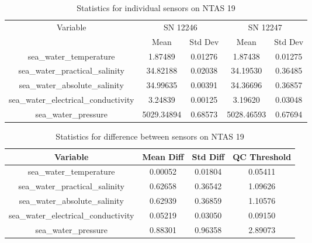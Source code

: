 \begin{table}[h]
\centering
\begin{tabular}{|c|c|c|c|c|}
\hline
Variable & \multicolumn{2}{c|}{SN 12246} & \multicolumn{2}{c|}{SN 12247} \\
& Mean & Std Dev & Mean & Std Dev \\
\hline
sea\_water\_temperature & 1.87489 & 0.01276 & 1.87438 & 0.01275 \\
sea\_water\_practical\_salinity & 34.82188 & 0.02038 & 34.19530 & 0.36485 \\
sea\_water\_absolute\_salinity & 34.99635 & 0.00391 & 34.36696 & 0.36857 \\
sea\_water\_electrical\_conductivity & 3.24839 & 0.00125 & 3.19620 & 0.03048 \\
sea\_water\_pressure & 5029.34894 & 0.68573 & 5028.46593 & 0.67694 \\
\hline
\end{tabular}
\caption{Statistics for individual sensors on NTAS 19}
\end{table}

\begin{table}[h]
\centering
\begin{tabular}{|c|c|c|c|}
\hline
Variable & Mean Diff & Std Diff & QC Threshold \\
\hline
sea\_water\_temperature & 0.00052 & 0.01804 & 0.05411 \\
sea\_water\_practical\_salinity & 0.62658 & 0.36542 & 1.09626 \\
sea\_water\_absolute\_salinity & 0.62939 & 0.36859 & 1.10576 \\
sea\_water\_electrical\_conductivity & 0.05219 & 0.03050 & 0.09150 \\
sea\_water\_pressure & 0.88301 & 0.96358 & 2.89073 \\
\hline
\end{tabular}
\caption{Statistics for difference between sensors on NTAS 19}
\end{table}

